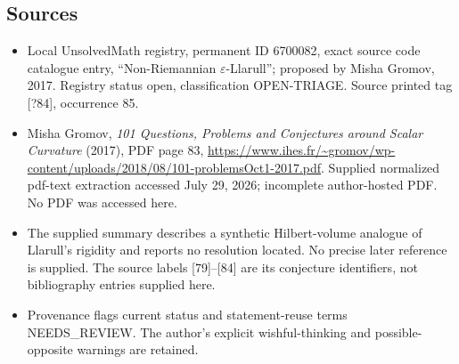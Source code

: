 \documentclass[11pt]{article}
\begin{document}
\subsection{Sources}
\begin{itemize}
\item Local UnsolvedMath registry, permanent ID 6700082, exact source code catalogue entry, ``Non-Riemannian $\varepsilon$-Llarull''; proposed by Misha Gromov, 2017. Registry status open, classification OPEN-TRIAGE. Source printed tag [?84], occurrence 85.
\item Misha Gromov, \emph{101 Questions, Problems and Conjectures around Scalar Curvature} (2017), PDF page 83, \url{https://www.ihes.fr/~gromov/wp-content/uploads/2018/08/101-problemsOct1-2017.pdf}. Supplied normalized pdf-text extraction accessed July 29, 2026; incomplete author-hosted PDF. No PDF was accessed here.
\item The supplied summary describes a synthetic Hilbert-volume analogue of Llarull's rigidity and reports no resolution located. No precise later reference is supplied. The source labels [79]--[84] are its conjecture identifiers, not bibliography entries supplied here.
\item Provenance flags current status and statement-reuse terms NEEDS\_REVIEW. The author's explicit wishful-thinking and possible-opposite warnings are retained.
\end{itemize}
\end{document}
